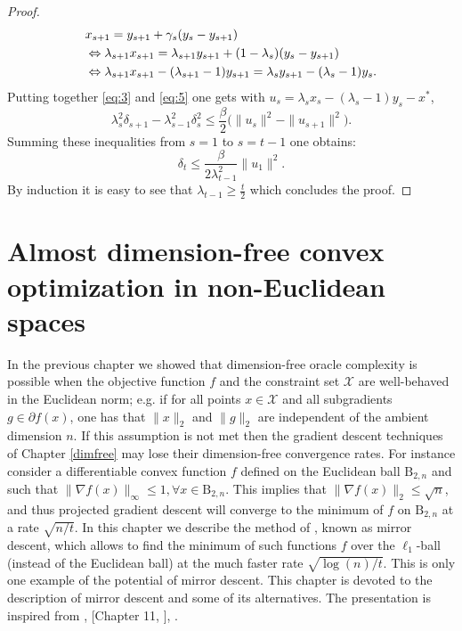 \documentclass[openany]{now}
\newcommand{\mB}{\mathrm{B}}
\newcommand{\cX}{\mathcal{X}}
\begin{document}
\begin{proof}
\begin{align}
& x_{s+1} = y_{s+1} + \gamma_s (y_s - y_{s+1}) \notag \\
& \Leftrightarrow \lambda_{s+1} x_{s+1} = \lambda_{s+1} y_{s+1} + (1-\lambda_{s})(y_s - y_{s+1}) \notag \\
& \Leftrightarrow \lambda_{s+1} x_{s+1} - (\lambda_{s+1} - 1) y_{s+1}= \lambda_{s} y_{s+1} - (\lambda_{s}-1) y_{s} . \label{eq:5}
\end{align}
Putting together \eqref{eq:3} and \eqref{eq:5} one gets with $u_s = \lambda_{s} x_{s} - (\lambda_{s} - 1) y_{s} - x^*$,
$$\lambda_{s}^2 \delta_{s+1} - \lambda_{s-1}^2 \delta_s^2 \leq \frac{\beta}{2} \bigg(\|u_s\|^2 - \|u_{s+1}\|^2 \bigg) .$$
Summing these inequalities from $s=1$ to $s=t-1$ one obtains:
$$\delta_t \leq \frac{\beta}{2 \lambda_{t-1}^2} \|u_1\|^2.$$
By induction it is easy to see that $\lambda_{t-1} \geq \frac{t}{2}$ which concludes the proof.
\end{proof} 
\chapter{Almost dimension-free convex optimization in non-Euclidean spaces}
\label{mirror}
In the previous chapter we showed that dimension-free oracle complexity is possible when the objective function $f$ and the constraint set $\cX$ are well-behaved in the Euclidean norm; e.g. if for all points $x \in \cX$ and all subgradients $g \in \partial f(x)$, one has that $\|x\|_2$ and $\|g\|_2$ are independent of the ambient dimension $n$. If this assumption is not met then the gradient descent techniques of Chapter \ref{dimfree} may lose their dimension-free convergence rates. For instance consider a differentiable convex function $f$ defined on the Euclidean ball $\mB_{2,n}$ and such that $\|\nabla f(x)\|_{\infty} \leq 1, \forall x \in \mB_{2,n}$. This implies that $\|\nabla f(x)\|_{2} \leq \sqrt{n}$, and thus projected gradient descent will converge to the minimum of $f$ on $\mB_{2,n}$ at a rate $\sqrt{n / t}$. In this chapter we describe the method of \cite{NY83}, known as mirror descent, which allows to find the minimum of such functions $f$ over the $\ell_1$-ball (instead of the Euclidean ball) at the much faster rate $\sqrt{\log(n) / t}$. This is only one example of the potential of mirror descent. This chapter is devoted to the description of mirror descent and some of its alternatives. The presentation is inspired from \cite{BT03}, [Chapter 11, \cite{CL06}], \cite{Rak09, Haz11, Bub11}.
\newpage
\end{document}
